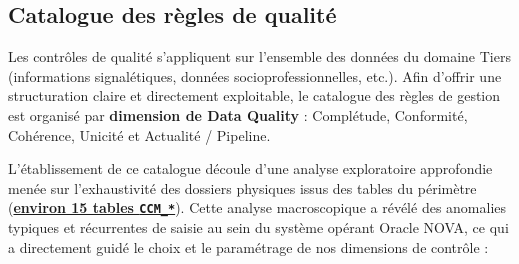 \begin{table}[H]
\centering
\caption{Dictionnaire simplifié des tables de faits de Qualité des Données}
\label{tab:dict_results_fact}
\renewcommand{\arraystretch}{1.3}
\end{table}

\subsection{Catalogue des règles de qualité}
Les contrôles de qualité s'appliquent sur l'ensemble des données du domaine Tiers (informations signalétiques, données socioprofessionnelles, etc.). Afin d'offrir une structuration claire et directement exploitable, le catalogue des règles de gestion est organisé par \textbf{dimension de Data Quality} : Complétude, Conformité, Cohérence, Unicité et Actualité / Pipeline.

L'établissement de ce catalogue découle d'une analyse exploratoire approfondie menée sur l'exhaustivité des dossiers physiques issus des tables du périmètre (\textbf{\uline{environ 15 tables \texttt{CCM\_*}}}). Cette analyse macroscopique a révélé des anomalies typiques et récurrentes de saisie au sein du système opérant Oracle NOVA, ce qui a directement guidé le choix et le paramétrage de nos dimensions de contrôle :

